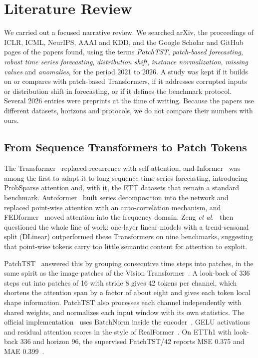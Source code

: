 \section{Literature Review}
\label{sec:lit}

We carried out a focused narrative review. We searched arXiv, the proceedings of ICLR, ICML, NeurIPS, AAAI and KDD, and the Google Scholar and GitHub pages of the papers found, using the terms \emph{PatchTST}, \emph{patch-based forecasting}, \emph{robust time series forecasting}, \emph{distribution shift}, \emph{instance normalization}, \emph{missing values} and \emph{anomalies}, for the period 2021 to 2026. A study was kept if it builds on or compares with patch-based Transformers, if it addresses corrupted inputs or distribution shift in forecasting, or if it defines the benchmark protocol. Several 2026 entries were preprints at the time of writing. Because the papers use different datasets, horizons and protocols, we do not compare their numbers with ours.

\subsection{From Sequence Transformers to Patch Tokens}

The Transformer~\cite{vaswani} replaced recurrence with self-attention, and Informer~\cite{informer} was among the first to adapt it to long-sequence time-series forecasting, introducing ProbSparse attention and, with it, the ETT datasets that remain a standard benchmark. Autoformer~\cite{autoformer} built series decomposition into the network and replaced point-wise attention with an auto-correlation mechanism, and FEDformer~\cite{fedformer} moved attention into the frequency domain. Zeng \textit{et al.}~\cite{dlinear} then questioned the whole line of work: one-layer linear models with a trend-seasonal split (DLinear) outperformed these Transformers on nine benchmarks, suggesting that point-wise tokens carry too little semantic content for attention to exploit.

PatchTST~\cite{patchtst} answered this by grouping consecutive time steps into patches, in the same spirit as the image patches of the Vision Transformer~\cite{vit}. A look-back of 336 steps cut into patches of 16 with stride 8 gives 42 tokens per channel, which shortens the attention span by a factor of about eight and gives each token local shape information. PatchTST also processes each channel independently with shared weights, and normalizes each input window with its own statistics. The official implementation~\cite{patchtst_code} uses BatchNorm inside the encoder~\cite{batchnorm}, GELU activations~\cite{gelu} and residual attention scores in the style of RealFormer~\cite{realformer}. On ETTh1 with look-back 336 and horizon 96, the supervised PatchTST/42 reports MSE 0.375 and MAE 0.399~\cite{patchtst}.

